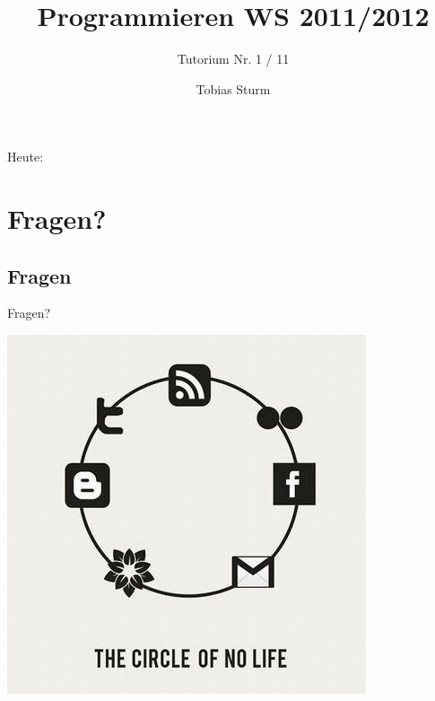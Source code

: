 \documentclass[18pt]{beamer}
\title[Proggen WS11/12]{Programmieren WS 2011/2012}
\subtitle{Tutorium Nr. 1 / 11}
\author{Tobias Sturm} %
\institute{Zertifizierbare Vertrauenswürdige Informatiksysteme}
\date[23.1.12] %
\begin{document}


\begin{frame}
	\titlepage
\end{frame}


\begin{frame}{Heute:}
	\tableofcontents
\end{frame}



\section{Fragen?}
\subsection*{Fragen} %
\begin{frame}	
	\begin{center}
		\huge{Fragen?}
	\end{center}
\end{frame}



\begin{frame}[full]
\includegraphics[scale=0.55]{bilder/comics/September-25-2011-18-44-59-aa71ce1bd67502c27bc56a6b8d724897.jpeg}
\end{frame}
\end{document}
